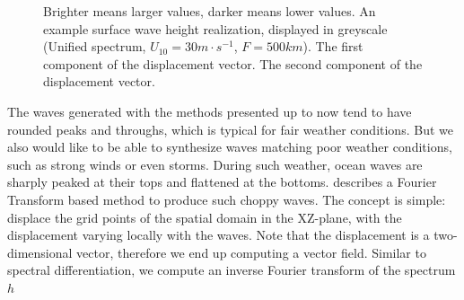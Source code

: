 \begin{figure}
{ }
 \hfill
\caption{
Brighter means larger values, darker means lower values.
 An example surface wave height
realization, displayed in greyscale (Unified spectrum, $U_{10}=30m\cdot s^{-1}$, $F=500km$).
 The first component of the displacement vector.
 The second component of the displacement vector.
}
\label{fig:displacements}
\end{figure}
%
The waves generated with the methods presented up to now tend to have rounded peaks and throughs,
which is typical for fair weather conditions. But we also would like to be able to synthesize waves
matching poor weather conditions, such as strong winds or even storms. During such weather, ocean waves
are sharply peaked at their tops and flattened at the bottoms. \citet{course:simulatingocean}
describes a Fourier Transform based method to produce such choppy waves. The concept is simple: displace
the grid points of the spatial domain in the XZ-plane, with the displacement varying locally with the waves.
Note that the displacement is a two-dimensional vector, therefore we end up computing a vector field.
Similar to spectral differentiation, we compute an inverse Fourier transform of the spectrum $h$
